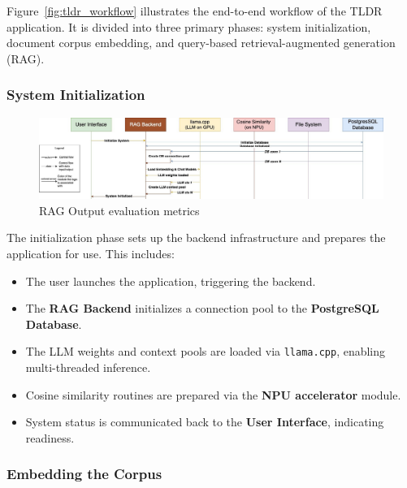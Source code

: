 Figure~\ref{fig:tldr_workflow} illustrates the end-to-end workflow of the TLDR application. It is divided into three primary phases: system initialization, document corpus embedding, and query-based retrieval-augmented generation (RAG).

\subsubsection{System Initialization}
\label{subsec:AppDesignWorkflow-SystemInitialization}

\begin{figure}[H]
    \centering
    \includegraphics[width=1.0\linewidth]{images/tldr-app-worklfow-pt1.jpg}
    \caption{RAG Output evaluation metrics ~\cite{cardenas2023rag}}
    \label{fig:autoregressive_decoding}
\end{figure}


The initialization phase sets up the backend infrastructure and prepares the application for use. This includes:

\begin{itemize}
    \item The user launches the application, triggering the backend.
    \item The \textbf{RAG Backend} initializes a connection pool to the \textbf{PostgreSQL Database}.
    \item The LLM weights and context pools are loaded via \texttt{llama.cpp}, enabling multi-threaded inference.
    \item Cosine similarity routines are prepared via the \textbf{NPU accelerator} module.
    \item System status is communicated back to the \textbf{User Interface}, indicating readiness.
\end{itemize}


\subsubsection{Embedding the Corpus}
\label{subsec:AppDesignWorkflow-EmbeddingCorpus}

